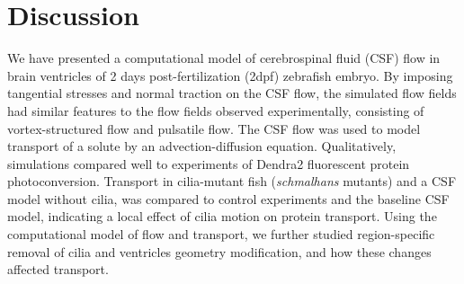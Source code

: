 \documentclass[fleqn]{wlscirep}
\begin{document}
\cleardoublepage


\section*{Discussion}
We have presented a computational model of cerebrospinal fluid (CSF) flow in brain ventricles of 2 days post-fertilization (2dpf) zebrafish embryo. By imposing tangential stresses and normal traction on the CSF flow, the simulated flow fields had similar features to the flow fields observed experimentally, consisting of vortex-structured flow and pulsatile flow. The CSF flow was used to model transport of a solute by an advection-diffusion equation. Qualitatively, simulations compared well to experiments of Dendra2 fluorescent protein photoconversion. Transport in cilia-mutant fish (\emph{schmalhans} mutants) and a CSF model without cilia, was compared to control experiments and the baseline CSF model, indicating a local effect of cilia motion on protein transport. Using the computational model of flow and transport, we further studied region-specific removal of cilia and ventricles geometry modification, and how these changes affected transport.
\end{document}
